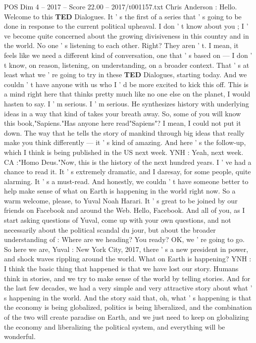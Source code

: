 \begin{textsample}{POS Dim 4 – 2017 – Score 22.00 – 2017/t001157.txt}  \label{ex:f4_pos_043}
Chris Anderson : Hello.
Welcome to this \textbf{TED} Dialogues.
It ' s the first of a series that ' s going to be done in response to the current political upheaval.
I don ' t know about you ; I ' ve become quite concerned about the growing divisiveness in this country and in the world.
No one ' s listening to each other.
Right?
They aren ' t.
I mean, it feels like we need a different kind of conversation, one that ' s based on — I don ' t know, on reason, listening, on understanding, on a broader context.
That ' s at least what we ' re going to try in these \textbf{TED} Dialogues, starting today.
And we couldn ' t have anyone with us who I ' d be more excited to kick this off.
This is a mind right here that thinks pretty much like no one else on the planet, I would hasten to say.
I ' m serious.
I ' m serious.
He synthesizes history with underlying ideas in a way that kind of takes your breath away.
So, some of you will know this book,"Sapiens."Has anyone here read"Sapiens"?
I mean, I could not put it down.
The way that he tells the story of mankind through big ideas that really make you think differently — it ' s kind of amazing.
And here ' s the follow-up, which I think is being published in the US next week.
YNH : Yeah, next week.
CA :"Homo Deus."Now, this is the history of the next hundred years.
I ' ve had a chance to read it.
It ' s extremely dramatic, and I daresay, for some people, quite alarming.
It ' s a must-read.
And honestly, we couldn ' t have someone better to help make sense of what on Earth is happening in the world right now.
So a warm welcome, please, to Yuval Noah Harari.
It ' s great to be joined by our friends on Facebook and around the Web.
Hello, Facebook.
And all of you, as I start asking questions of Yuval, come up with your own questions, and not necessarily about the political scandal du jour, but about the broader understanding of : Where are we heading?
You ready?
OK, we ' re going to go.
So here we are, Yuval : New York City, 2017, there ' s a new president in power, and shock waves rippling around the world.
What on Earth is happening?
YNH : I think the basic thing that happened is that we have lost our story.
Humans think in stories, and we try to make sense of the world by telling stories.
And for the last few decades, we had a very simple and very attractive story about what ' s happening in the world.
And the story said that, oh, what ' s happening is that the economy is being globalized, politics is being liberalized, and the combination of the two will create paradise on Earth, and we just need to keep on globalizing the economy and liberalizing the political system, and everything will be wonderful.

\end{textsample}
